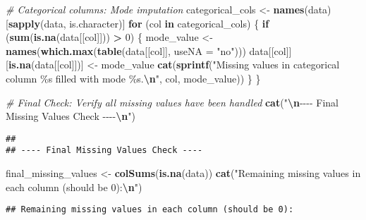 \documentclass[
]{article}
\newenvironment{Shaded}{\begin{snugshade}}{\end{snugshade}}
\newcommand{\AttributeTok}[1]{\textcolor[rgb]{0.13,0.29,0.53}{#1}}
\newcommand{\CommentTok}[1]{\textcolor[rgb]{0.56,0.35,0.01}{\textit{#1}}}
\newcommand{\ControlFlowTok}[1]{\textcolor[rgb]{0.13,0.29,0.53}{\textbf{#1}}}
\newcommand{\DecValTok}[1]{\textcolor[rgb]{0.00,0.00,0.81}{#1}}
\newcommand{\FunctionTok}[1]{\textcolor[rgb]{0.13,0.29,0.53}{\textbf{#1}}}
\newcommand{\NormalTok}[1]{#1}
\newcommand{\OtherTok}[1]{\textcolor[rgb]{0.56,0.35,0.01}{#1}}
\newcommand{\SpecialCharTok}[1]{\textcolor[rgb]{0.81,0.36,0.00}{\textbf{#1}}}
\newcommand{\StringTok}[1]{\textcolor[rgb]{0.31,0.60,0.02}{#1}}
\begin{document}
\begin{Shaded}
\begin{Highlighting}[]
\CommentTok{\# Categorical columns: Mode imputation}
\NormalTok{categorical\_cols }\OtherTok{\textless{}{-}} \FunctionTok{names}\NormalTok{(data)[}\FunctionTok{sapply}\NormalTok{(data, is.character)]}
\ControlFlowTok{for}\NormalTok{ (col }\ControlFlowTok{in}\NormalTok{ categorical\_cols) \{}
  \ControlFlowTok{if}\NormalTok{ (}\FunctionTok{sum}\NormalTok{(}\FunctionTok{is.na}\NormalTok{(data[[col]])) }\SpecialCharTok{\textgreater{}} \DecValTok{0}\NormalTok{) \{}
\NormalTok{    mode\_value }\OtherTok{\textless{}{-}} \FunctionTok{names}\NormalTok{(}\FunctionTok{which.max}\NormalTok{(}\FunctionTok{table}\NormalTok{(data[[col]], }\AttributeTok{useNA =} \StringTok{"no"}\NormalTok{)))}
\NormalTok{    data[[col]][}\FunctionTok{is.na}\NormalTok{(data[[col]])] }\OtherTok{\textless{}{-}}\NormalTok{ mode\_value}
    \FunctionTok{cat}\NormalTok{(}\FunctionTok{sprintf}\NormalTok{(}\StringTok{"Missing values in categorical column \textquotesingle{}\%s\textquotesingle{} filled with mode \textquotesingle{}\%s\textquotesingle{}.}\SpecialCharTok{\textbackslash{}n}\StringTok{"}\NormalTok{, col, mode\_value))}
\NormalTok{  \}}
\NormalTok{\}}

\CommentTok{\# Final Check: Verify all missing values have been handled}
\FunctionTok{cat}\NormalTok{(}\StringTok{"}\SpecialCharTok{\textbackslash{}n}\StringTok{{-}{-}{-}{-} Final Missing Values Check {-}{-}{-}{-}}\SpecialCharTok{\textbackslash{}n}\StringTok{"}\NormalTok{)}
\end{Highlighting}
\end{Shaded}

\begin{verbatim}
## 
## ---- Final Missing Values Check ----
\end{verbatim}

\begin{Shaded}
\begin{Highlighting}[]
\NormalTok{final\_missing\_values }\OtherTok{\textless{}{-}} \FunctionTok{colSums}\NormalTok{(}\FunctionTok{is.na}\NormalTok{(data))}
\FunctionTok{cat}\NormalTok{(}\StringTok{"Remaining missing values in each column (should be 0):}\SpecialCharTok{\textbackslash{}n}\StringTok{"}\NormalTok{)}
\end{Highlighting}
\end{Shaded}

\begin{verbatim}
## Remaining missing values in each column (should be 0):
\end{verbatim}
\end{document}
